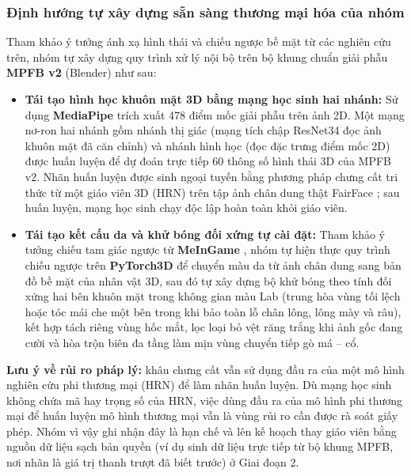 \subsubsection{Định hướng tự xây dựng sẵn sàng thương mại hóa của nhóm}
Tham khảo ý tưởng ánh xạ hình thái và chiếu ngược bề mặt từ các nghiên cứu trên, nhóm tự xây dựng quy trình xử lý nội bộ trên bộ khung chuẩn giải phẫu \textbf{MPFB v2} (Blender) \cite{mpfb2} như sau:
\begin{itemize}
    \item \textbf{Tái tạo hình học khuôn mặt 3D bằng mạng học sinh hai nhánh:} Sử dụng \textbf{MediaPipe} \cite{mediapipe} trích xuất 478 điểm mốc giải phẫu trên ảnh 2D. Một mạng nơ-ron hai nhánh gồm nhánh thị giác (mạng tích chập ResNet34 \cite{resnet} đọc ảnh khuôn mặt đã căn chỉnh) và nhánh hình học (đọc đặc trưng điểm mốc 2D) được huấn luyện để dự đoán trực tiếp $60$ thông số hình thái 3D của MPFB v2. Nhãn huấn luyện được sinh ngoại tuyến bằng phương pháp chưng cất tri thức từ một giáo viên 3D (HRN) trên tập ảnh chân dung thật FairFace \cite{fairface}; sau huấn luyện, mạng học sinh chạy độc lập hoàn toàn khỏi giáo viên.
    \item \textbf{Tái tạo kết cấu da và khử bóng đối xứng tự cài đặt:} Tham khảo ý tưởng chiếu tam giác ngược từ \textbf{MeInGame} \cite{meingame}, nhóm tự hiện thực quy trình chiếu ngược trên \textbf{PyTorch3D} \cite{pytorch3d} để chuyển màu da từ ảnh chân dung sang bản đồ bề mặt của nhân vật 3D, sau đó tự xây dựng bộ khử bóng theo tính đối xứng hai bên khuôn mặt trong không gian màu Lab (trung hòa vùng tối lệch hoặc tóc mái che một bên trong khi bảo toàn lỗ chân lông, lông mày và râu), kết hợp tách riêng vùng hốc mắt, lọc loại bỏ vệt răng trắng khi ảnh gốc đang cười và hòa trộn biên đa tầng làm mịn vùng chuyển tiếp gò má -- cổ.
\end{itemize}

\textbf{Lưu ý về rủi ro pháp lý:} khâu chưng cất vẫn sử dụng đầu ra của một mô hình nghiên cứu phi thương mại (HRN) để làm nhãn huấn luyện. Dù mạng học sinh không chứa mã hay trọng số của HRN, việc dùng đầu ra của mô hình phi thương mại để huấn luyện mô hình thương mại vẫn là vùng rủi ro cần được rà soát giấy phép. Nhóm vì vậy ghi nhận đây là hạn chế và lên kế hoạch thay giáo viên bằng nguồn dữ liệu sạch bản quyền (ví dụ sinh dữ liệu trực tiếp từ bộ khung MPFB, nơi nhãn là giá trị thanh trượt đã biết trước) ở Giai đoạn 2.
